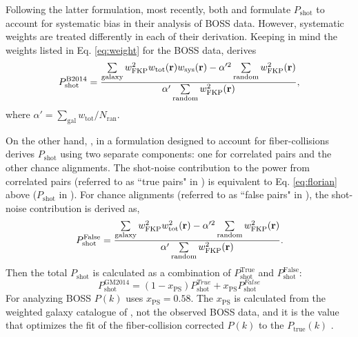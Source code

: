\documentclass{emulateapj}
\begin{document}
Following the latter formulation, most recently, both \cite{Beutler:2014aa} and \cite{Gil-Marin:2014aa} formulate $P_\mathrm{shot}$ to account for systematic bias in their analysis of BOSS data. However, systematic weights are treated differently in each of their derivation. Keeping in mind the weights listed in Eq. \ref{eq:weight} for the BOSS data, \cite{Beutler:2014aa} derives
\begin{equation} \label{eq:florian}
P^\mathrm{B2014}_\mathrm{shot} = \frac{\sum\limits_{\mathrm{galaxy}} w^2_\mathrm{FKP}w_\mathrm{tot}({\bf r})w_\mathrm{sys}({\bf r}) - \alpha'^2 \sum\limits_{\mathrm{random}} w_\mathrm{FKP}^2({\bf r})}{\alpha' \sum\limits_{\mathrm{random}}w_\mathrm{FKP}^2({\bf r})}, 
\end{equation}
where $\alpha' = \sum_\mathrm{gal} w_\mathrm{tot} / N_\mathrm{ran}$. 

On the other hand, \cite{Gil-Marin:2014aa}, in a formulation designed to account for fiber-collisions derives $P_\mathrm{shot}$ using two separate components: one for correlated pairs and the other chance alignments. The shot-noise contribution to the power from correlated pairs (referred to as ``true pairs" in \citealt{Gil-Marin:2014aa}) is equivalent to Eq. \ref{eq:florian} above ($P_\mathrm{shot}$ in \cite{Beutler:2014aa}). For chance alignments (referred to as ``false pairs" in \citealt{Gil-Marin:2014aa}), the shot-noise contribution is derived as, 
\begin{equation} \label{eq:gm_falsepairs}
P^\mathrm{False}_\mathrm{shot} = \frac{\sum\limits_{\mathrm{galaxy}} w^2_\mathrm{FKP}w^2_\mathrm{tot}({\bf r}) - \alpha'^2 \sum\limits_{\mathrm{random}} w_\mathrm{FKP}^2({\bf r})}{\alpha' \sum\limits_{\mathrm{random}}w_\mathrm{FKP}^2({\bf r})}.
\end{equation}
Then the total $P_\mathrm{shot}$ is calculated as a combination of $P^\mathrm{True}_\mathrm{shot}$ and $P^\mathrm{False}_\mathrm{shot}$: 
\begin{equation} \label{eq:gm_shot}
P^\mathrm{GM2014}_\mathrm{shot} = (1- x_\mathrm{PS}) P^{True}_\mathrm{shot} + x_\mathrm{PS} P^{False}_\mathrm{shot}
\end{equation}
For analyzing BOSS $P(k)$ \cite{Gil-Marin:2014aa} uses $x_\mathrm{PS} = 0.58$. The $x_\mathrm{PS}$ is calculated from the weighted galaxy catalogue of \cite{Manera:2013aa}, not the observed BOSS data, and it is the value that optimizes the fit of the fiber-collision corrected $P(k)$ to the $P_\mathrm{true}(k)$ .  
\end{document}
